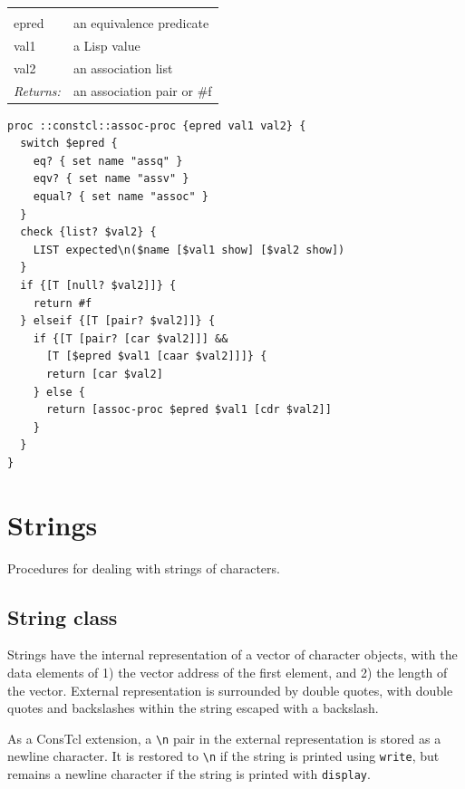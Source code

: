 \documentclass[twoside,9pt]{report}
\begin{document}
\noindent\begin{tabular}{ |p{1.9cm} p{8cm}| }
\hline
\rowcolor[HTML]{CCCCCC} \multicolumn{2}{|l|}{\bf assoc-proc (internal)} \\
epred & an equivalence predicate \\
val1 & a Lisp value \\
val2 & an association list \\
\textit{Returns:} & an association pair or \#f \\
\hline
\end{tabular}
\begin{lstlisting}
proc ::constcl::assoc-proc {epred val1 val2} {
  switch $epred {
    eq? { set name "assq" }
    eqv? { set name "assv" }
    equal? { set name "assoc" }
  }
  check {list? $val2} {
    LIST expected\n($name [$val1 show] [$val2 show])
  }
  if {[T [null? $val2]]} {
    return #f
  } elseif {[T [pair? $val2]]} {
    if {[T [pair? [car $val2]]] && 
      [T [$epred $val1 [caar $val2]]]} {
      return [car $val2]
    } else {
      return [assoc-proc $epred $val1 [cdr $val2]]
    }
  }
}
\end{lstlisting}
\section{Strings}
\label{strings}


Procedures for dealing with strings of characters.

\subsection{String class}
\label{string-class}


Strings have the internal representation of a vector of character objects, with the data elements of 1) the vector address of the first element, and 2) the length of the vector. External representation is surrounded by double quotes, with double quotes and backslashes within the string escaped with a backslash.


As a ConsTcl extension, a \texttt{\textbackslash n} pair in the external representation is stored as a newline character. It is restored to \texttt{\textbackslash n} if the string is printed using \texttt{write}, but remains a newline character if the string is printed with \texttt{display}.
\end{document}
